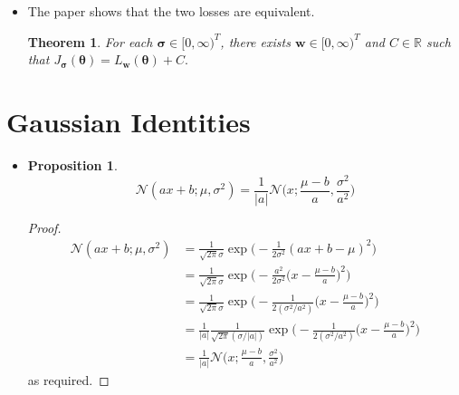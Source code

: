 \documentclass[10pt]{article}
\newtheorem{theorem}[lemma]{Theorem}
\newtheorem{proposition}[lemma]{Proposition}
\newcommand{\ve}[1]{\mathbf{#1}}
\newcommand{\ves}[1]{\boldsymbol{#1}}
\newcommand{\mcal}[1]{\mathcal{#1}}
\newcommand{\Real}{\mathbb{R}}
\begin{document}
\begin{itemize}
  \item The paper shows that the two losses are equivalent.
  \begin{theorem}
    For each $\ves{\sigma} \in [0,\infty)^T$, there exists $\ve{w} \in [0,\infty)^T$ and $C \in \Real$ such that $J_{\ves{\sigma}}(\ves{\theta}) = L_{\ve{w}}(\ves{\theta}) + C.$
  \end{theorem}  
\end{itemize}

\appendix

\section{Gaussian Identities}

\begin{itemize}
  \item \begin{proposition} \label{gaussian-scaling}
    $$\mcal{N}(ax + b; \mu, \sigma^2) = \frac{1}{|a|} \mcal{N}\bigg( x ; \frac{\mu - b}{a}, \frac{\sigma^2}{a^2} \bigg)$$
  \end{proposition}
  \begin{proof}
    \begin{align*}
    \mcal{N}(ax + b; \mu, \sigma^2)
    &= \frac{1}{\sqrt{2\pi}\sigma} \exp\bigg(-\frac{1}{2\sigma^2} (ax+b-\mu)^2 \bigg) \\
    &= \frac{1}{\sqrt{2\pi}\sigma} \exp\bigg(-\frac{a^2}{2\sigma^2} \bigg(x-\frac{\mu-b}{a} \bigg)^2 \bigg) \\
    &= \frac{1}{\sqrt{2\pi}\sigma} \exp\bigg(-\frac{1}{2(\sigma^2/a^2)} \bigg(x-\frac{\mu-b}{a} \bigg)^2 \bigg) \\
    &= \frac{1}{|a|} \frac{1}{\sqrt{2\pi}(\sigma / |a|)} \exp\bigg(-\frac{1}{2(\sigma^2/a^2)} \bigg(x-\frac{\mu-b}{a} \bigg)^2 \bigg) \\
    &= \frac{1}{|a|}\mcal{N}\bigg( x ; \frac{\mu - b}{a}, \frac{\sigma^2}{a^2} \bigg)
    \end{align*}
    as required.
  \end{proof}


\end{itemize}
\end{document}
